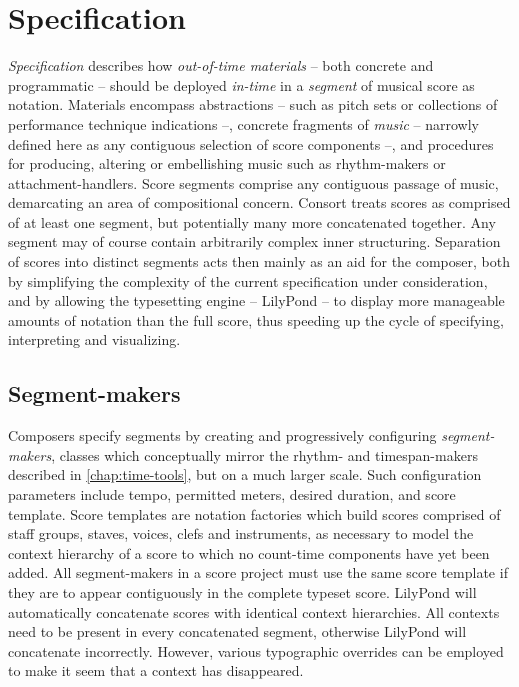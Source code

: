 \section{Specification}
\label{sec:specification}

\emph{Specification} describes how \emph{out-of-time materials} -- both
concrete and programmatic -- should be deployed \emph{in-time} in a
\emph{segment} of musical score as notation. Materials encompass abstractions
-- such as pitch sets or collections of performance technique indications --,
concrete fragments of \emph{music} -- narrowly defined here as any contiguous
selection of score components --, and procedures for producing, altering or
embellishing music such as rhythm-makers or attachment-handlers. Score segments
comprise any contiguous passage of music, demarcating an area of compositional
concern. Consort treats scores as comprised of at least one segment, but
potentially many more concatenated together. Any segment may of course contain
arbitrarily complex inner structuring. Separation of scores into distinct
segments acts then mainly as an aid for the composer, both by simplifying the
complexity of the current specification under consideration, and by allowing
the typesetting engine -- LilyPond -- to display more manageable amounts of
notation than the full score, thus speeding up the cycle of specifying,
interpreting and visualizing.

\subsection{Segment-makers}
\label{ssec:segment-makers}

Composers specify segments by creating and progressively configuring
\emph{segment-makers}, classes which conceptually mirror the rhythm- and
timespan-makers described in \autoref{chap:time-tools}, but on a much larger
scale. Such configuration parameters include tempo, permitted meters, desired
duration, and score template. Score templates are notation factories which
build scores comprised of staff groups, staves, voices, clefs and instruments,
as necessary to model the context hierarchy of a score to which no count-time
components have yet been added. All segment-makers in a score project must use
the same score template if they are to appear contiguously in the complete
typeset score. LilyPond will automatically concatenate scores with identical
context hierarchies. All contexts need to be present in every concatenated
segment, otherwise LilyPond will concatenate incorrectly. However, various
typographic overrides can be employed to make it seem that a context has
disappeared.


